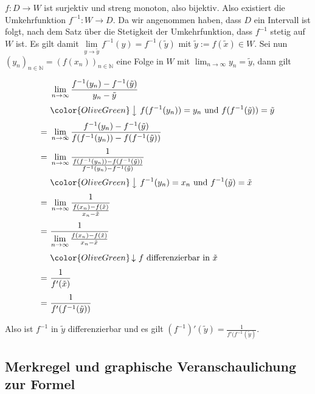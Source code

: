 \documentclass[fontsize=9pt,
               parskip=half-,
               DIV=14,
               listof=chapterentry,
               tocflat]{scrbook}
\begin{document}
\begin{proof*}
$f:D\to W$ ist surjektiv und streng monoton, also bijektiv. Also existiert die Umkehrfunktion $f^{-1}:W\to D$. Da wir angenommen haben, dass $D$ ein Intervall ist folgt, nach dem Satz über die Stetigkeit der Umkehrfunktion, dass $f^{-1}$ stetig auf $W$ ist. Es gilt damit $\lim \limits _{y\to {\tilde {y}}}{f^{-1}(y)}=f^{-1}({\tilde {y}})$ mit ${\tilde {y}}:=f({\tilde {x}})\in W$. Sei nun $(y_{n})_{n\in \mathbb {N} }=(f(x_{n}))_{n\in \mathbb {N} }$ eine Folge in $W$ mit $\lim _{n\to \infty }y_{n}={\tilde {y}}$, dann gilt

\begin{align*}
&\lim \limits _{n\to \infty }{\frac {f^{-1}(y_{n})-f^{-1}({\tilde {y}})}{y_{n}-{\tilde {y}}}}\\[0.3em]&{\color {OliveGreen}\left\downarrow \ f(f^{-1}(y_{n}))=y_{n}{\text{ und }}f(f^{-1}({\tilde {y}}))={\tilde {y}}\right.}\\[0.3em]=\ &\lim \limits _{n\to {\tilde {\infty }}}{\frac {f^{-1}(y_{n})-f^{-1}({\tilde {y}})}{f(f^{-1}(y_{n}))-f(f^{-1}({\tilde {y}}))}}\\[0.3em]=\ &\lim \limits _{n\to \infty }{\frac {1}{\frac {f(f^{-1}(y_{n}))-f(f^{-1}({\tilde {y}}))}{f^{-1}(y_{n})-f^{-1}({\tilde {y}})}}}\\[0.3em]&{\color {OliveGreen}\left\downarrow \ f^{-1}(y_{n})=x_{n}{\text{ und }}f^{-1}({\tilde {y}})={\tilde {x}}\right.}\\[0.3em]=\ &\lim \limits _{n\to \infty }{\frac {1}{\frac {f(x_{n})-f({\tilde {x}})}{x_{n}-{\tilde {x}}}}}\\[0.3em]=\ &{\frac {1}{\lim \limits _{n\to \infty }{\frac {f(x_{n})-f({\tilde {x}})}{x_{n}-{\tilde {x}}}}}}\\[0.3em]&{\color {OliveGreen}\left\downarrow \ f{\text{ differenzierbar in }}{\tilde {x}}\right.}\\[0.3em]=\ &{\frac {1}{f'({\tilde {x}})}}\\[0.3em]=\ &{\frac {1}{f'(f^{-1}({\tilde {y}}))}}
\end{align*}

Also ist $f^{-1}$ in ${\tilde {y}}$ differenzierbar und es gilt $(f^{-1})'({\tilde {y}})={\frac {1}{f'(f^{-1}({\tilde {y}})}}$.

\end{proof*}

\subsection{Merkregel und graphische Veranschaulichung zur Formel}
\end{document}
